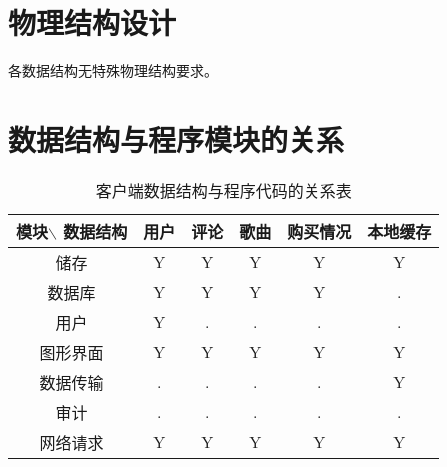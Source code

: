 \subsection{}

\section{物理结构设计}
各数据结构无特殊物理结构要求。

\section{数据结构与程序模块的关系}
\begin{table}[htbp]
\centering
\caption{客户端数据结构与程序代码的关系表} \label{tab:datastructure-module-client}
\begin{tabular}{|c|c|c|c|c|c|}
    \hline
    模块$\backslash$ 数据结构 & 用户 & 评论 & 歌曲 & 购买情况 & 本地缓存 \\
    \hline
    储存 & Y & Y & Y & Y & Y \\
    \hline
    数据库 & Y & Y & Y & Y & . \\
    \hline
    用户 & Y & . & . & . & . \\
    \hline
    图形界面 & Y & Y & Y & Y & Y \\
    \hline
    数据传输 & . & . & . & . & Y \\
    \hline
    审计 & . & . & . & . & . \\
    \hline
    网络请求 & Y & Y & Y & Y & Y \\
    \hline
\end{tabular}
\end{table}

